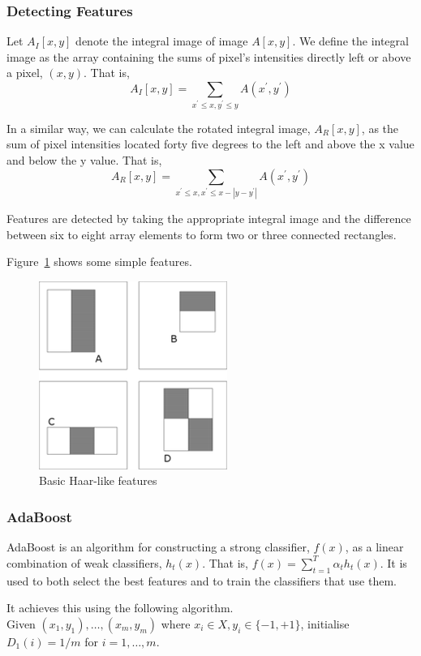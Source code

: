 \documentclass{article}
\begin{document}
\subsubsection{Detecting Features}
Let $A_I[x,y]$ denote the integral image of image $A[x,y]$. We define the integral image as the array containing the sums of pixel's intensities directly left or above a pixel, $(x, y)$. That is,
\begin{equation}
	A_I[x,y] = \sum_{x^\prime\le x, y^\prime\le y}A(x^\prime, y^\prime)
\end{equation}

In a similar way, we can calculate the rotated integral image, $A_R[x,y]$, as the sum of pixel intensities located forty five degrees to the left and above the x value and below the y value. That is,
\begin{equation}
	A_R[x,y] = \sum_{x^\prime\le x, x^\prime\le x-|y-y^\prime|}A(x^\prime, y^\prime)
\end{equation}

Features are detected by taking the appropriate integral image and the difference between six to eight array elements to form two or three connected rectangles.

Figure~\ref{fig:features} shows some simple features.
\begin{figure}[H]
\centering
\includegraphics[width=0.2\linewidth]{./haarfeatures}
\caption{Basic Haar-like features}
\label{fig:features}
\end{figure} %

\subsubsection{AdaBoost}
AdaBoost is an algorithm for constructing a strong classifier, $f(x)$, as a linear combination of weak classifiers, $h_t(x)$. That is, $f(x)=\sum_{t=1}^{T}\alpha_th_t(x)$. It is used to both select the best features and to train the classifiers that use them.

It achieves this using the following algorithm.\\

\noindent Given $(x_1, y_1),\ldots,(x_m,y_m)$ where $x_i\in X, y_i\in\{-1,+1\}$, initialise $D_1(i)=1/m$ for $i=1,\ldots,m$.
\end{document}
